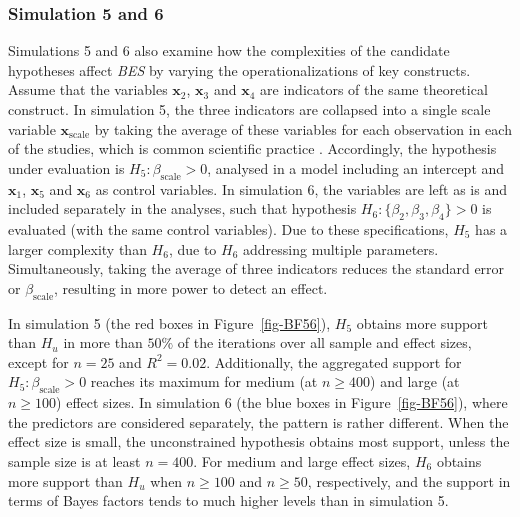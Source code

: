 \documentclass[
]{article}
\begin{document}
\hypertarget{simulation-5-and-6}{%
\subsubsection{Simulation 5 and 6}\label{simulation-5-and-6}}

Simulations 5 and 6 also examine how the complexities of the candidate
hypotheses affect \emph{BES} by varying the operationalizations of key
constructs. Assume that the variables \(\boldsymbol{x}_2\),
\(\boldsymbol{x}_3\) and \(\boldsymbol{x}_4\) are indicators of the same
theoretical construct. In simulation 5, the three indicators are
collapsed into a single scale variable \(\boldsymbol{x}_{\text{scale}}\)
by taking the average of these variables for each observation in each of
the studies, which is common scientific practice
\citep{bauer_discrepancy_2016}. Accordingly, the hypothesis under
evaluation is \(H_5: \beta_{\text{scale}} > 0\), analysed in a model
including an intercept and \(\boldsymbol{x}_1\), \(\boldsymbol{x}_5\)
and \(\boldsymbol{x}_6\) as control variables. In simulation 6, the
variables are left as is and included separately in the analyses, such
that hypothesis \(H_6: \{\beta_2,\beta_3,\beta_4\} > 0\) is evaluated
(with the same control variables). Due to these specifications, \(H_5\)
has a larger complexity than \(H_6\), due to \(H_6\) addressing multiple
parameters. Simultaneously, taking the average of three indicators
reduces the standard error or \(\beta_{\text{scale}}\), resulting in
more power to detect an effect.

In simulation 5 (the red boxes in Figure~\ref{fig-BF56}), \(H_5\)
obtains more support than \(H_u\) in more than \(50\%\) of the
iterations over all sample and effect sizes, except for \(n = 25\) and
\(R^2 = 0.02\). Additionally, the aggregated support for
\(H_5: \beta_{\text{scale}}>0\) reaches its maximum for medium (at
\(n \geq 400\)) and large (at \(n \geq 100\)) effect sizes. In
simulation 6 (the blue boxes in Figure~\ref{fig-BF56}), where the
predictors are considered separately, the pattern is rather different.
When the effect size is small, the unconstrained hypothesis obtains most
support, unless the sample size is at least \(n = 400\). For medium and
large effect sizes, \(H_6\) obtains more support than \(H_u\) when
\(n \geq 100\) and \(n \geq 50\), respectively, and the support in terms
of Bayes factors tends to much higher levels than in simulation 5.
\end{document}
